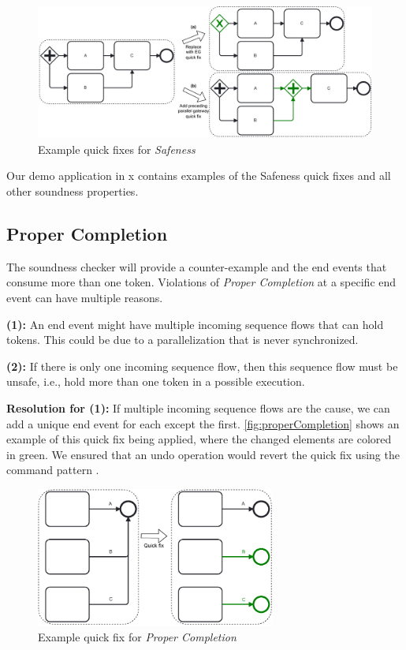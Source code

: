 \documentclass[runningheads]{llncs}
\begin{document}
\begin{figure}[ht]
	\centering
	\includegraphics[width=1\textwidth]{images/safeness}
	\caption{Example quick fixes for \textit{Safeness}}
	\label{fig:safeness}
\end{figure}

Our demo application in x contains examples of the Safeness quick fixes and all other soundness properties.

\subsection{Proper Completion}
The soundness checker will provide a counter-example and the end events that consume more than one token.
Violations of \textit{Proper Completion} at a specific end event can have multiple reasons.

\textbf{(1):} An end event might have multiple incoming sequence flows that can hold tokens.
This could be due to a parallelization that is never synchronized.

\textbf{(2):} If there is only one incoming sequence flow, then this sequence flow must be unsafe, i.e., hold more than one token in a possible execution.

\textbf{Resolution for (1):} If multiple incoming sequence flows are the cause, we can add a unique end event for each except the first.
\autoref{fig:properCompletion} shows an example of this quick fix being applied, where the changed elements are colored in green.
We ensured that an undo operation would revert the quick fix using the command pattern \cite{gammaDesignPatternsElements1995}.

\begin{figure}[ht]
	\centering
	\includegraphics[width=0.7\textwidth]{images/properCompletion}
	\caption{Example quick fix for \textit{Proper Completion}}
	\label{fig:properCompletion}
\end{figure}
\end{document}
